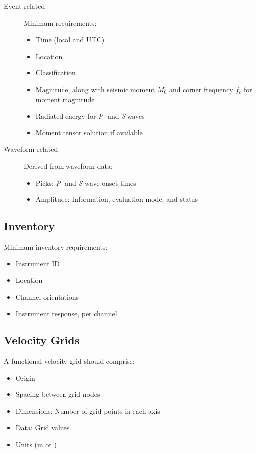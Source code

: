 \begin{description}
    \item[Event-related] Minimum requirements:
    \begin{itemize}
        \item Time (local and UTC)
        \item Location
        \item Classification 
        \item Magnitude, along with seismic moment \( M_0 \) and corner frequency \( f_c \) for moment magnitude
        \item Radiated energy for \textit{P}- and \textit{S}-waves
        \item Moment tensor solution if available
    \end{itemize}
    \item[Waveform-related] Derived from waveform data:
    \begin{itemize}
        \item Picks: \textit{P}- and \textit{S}-wave onset times
        \item Amplitude: Information, evaluation mode, and status
    \end{itemize}
\end{description}

\subsection{Inventory}

Minimum inventory requirements:

\begin{itemize}
    \item Instrument ID
    \item Location
    \item Channel orientations
    \item Instrument response, per channel
\end{itemize}

\subsection{Velocity Grids}

A functional velocity grid should comprise:

\begin{itemize}
    \item Origin
    \item Spacing between grid nodes
    \item Dimensions: Number of grid points in each axis
    \item Data: Grid values
    \item Units (\si{\meter} or \si{\foot})
\end{itemize}






